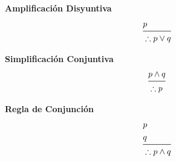 \documentclass[12pt, fleqn]{report}                             %
\theoremstyle{break}                                            %
\begin{document}
            \bigskip

            \begin{multicols}{2}
                
                \large{\textbf{Amplificación Disyuntiva}}
                    \begin{equation*}
                    \begin{split}
                        &p              \\
                        \midrule
                        &\therefore p \lor q
                    \end{split}
                    \end{equation*}

                \large{\textbf{Simplificación Conjuntiva}}
                    \begin{equation*}
                    \begin{split}
                        &p \land q      \\
                        \midrule
                        &\therefore p
                    \end{split}
                    \end{equation*}

            \end{multicols}



            \clearpage

            \large{\textbf{Regla de Conjunción}}
            \begin{equation*}
            \begin{split}
                &p                  \\
                &q                  \\
                \midrule
                &\therefore p \land q
            \end{split}
            \end{equation*}


            \bigskip
\end{document}
